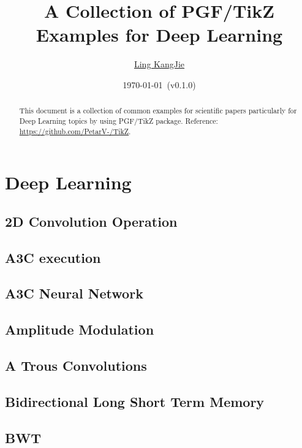 \documentclass{article}
\newcommand{\example}[1]{
\resizebox{\linewidth}{!}{

}

}
\begin{document}
\title{A Collection of PGF/TikZ Examples for Deep Learning}
\author{\href{1815428489@qq.com}{Ling KangJie}}
\date{\today{}~(v0.1.0)}
\maketitle

\begin{abstract}
  This document is a collection of common examples for scientific papers particularly for Deep Learning topics by using PGF/TikZ package.
Reference: 
  \href{https://github.com/PetarV-/TikZ}{https://github.com/PetarV-/TikZ}.
\end{abstract}

\tableofcontents

\section{Deep Learning}

\subsection{2D Convolution Operation}
\example{2d_convolution}
\subsection{A3C execution}
\example{a3c_execution}
\subsection{A3C Neural Network}
\example{a3c_neural_network}
\subsection{Amplitude Modulation}
\example{amplitude_modulation}
\subsection{A Trous Convolutions}
\example{a_trous_convolutions}
\subsection{Bidirectional Long Short Term Memory}
\example{bidirectional_long_short-term_memory}
\subsection{BWT}
\example{bwt}
\end{document}
